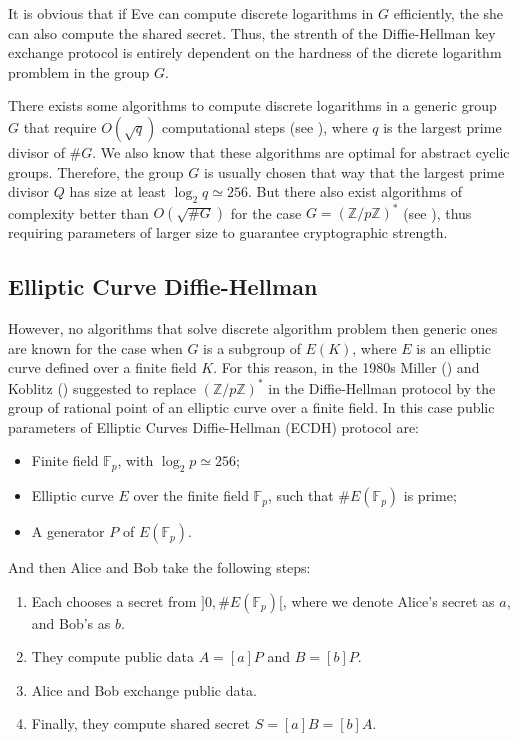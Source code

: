 \documentclass{article}
\theoremstyle{theorem}
\theoremstyle{definition}
\begin{document}
It is obvious that if Eve can compute discrete logarithms in $G$ efficiently, the she can also compute the shared secret. Thus, the strenth of the Diffie-Hellman key exchange protocol is entirely dependent on the hardness of the dicrete logarithm promblem in the group $G$.

There exists some algorithms to compute discrete logarithms in a generic group $G$ that require $O(\sqrt{q})$ computational steps (see \cite{Joux}), where $q$ is the largest prime divisor of $\#G$. We also know that these algorithms are optimal for abstract cyclic groups. Therefore, the group $G$ is usually chosen that way that the largest prime divisor $Q$ has size at least $\log_2q \simeq 256$. But there also exist algorithms of complexity better than $O(\sqrt{\#G})$ for the case $G = (\mathbb{Z}/p\mathbb{Z})^{\ast}$ (see \cite{Joux}), thus requiring parameters of larger size to guarantee cryptographic strength.

\subsection{Elliptic Curve Diffie-Hellman}

However, no algorithms that solve discrete algorithm problem then generic ones are known for the case when $G$ is a subgroup of $E(K)$, where $E$ is an elliptic curve defined over a finite field $K$. For this reason, in the 1980s Miller (\cite{Miller}) and Koblitz (\cite{Koblitz}) suggested to replace $(\mathbb{Z}/p\mathbb{Z})^{\ast}$ in the Diffie-Hellman protocol by the group of rational point of an elliptic curve over a finite field. In this case public parameters of Elliptic Curves Diffie-Hellman (ECDH) protocol are:

	\begin{itemize}
		\item Finite field $\mathbb{F}_p$, with $\log_2p \simeq 256$;
		
		\item Elliptic curve $E$ over the finite field $\mathbb{F}_p$, such that $\#E(\mathbb{F}_p)$ is prime;
		
		\item A generator $P$ of $E(\mathbb{F}_p)$.
	\end{itemize} 

And then Alice and Bob take the following steps:

	\begin{enumerate}
		\item Each chooses a secret from $]0, \#E(\mathbb{F}_p)[$, where we denote Alice's secret as $a$, and Bob's as $b$.
		
		\item They compute public data $A = [a]P$ and $B = [b]P$.
		
		\item Alice and Bob exchange public data.
		
		\item Finally, they compute shared secret $S = [a]B = [b]A$.
	\end{enumerate}
\end{document}

